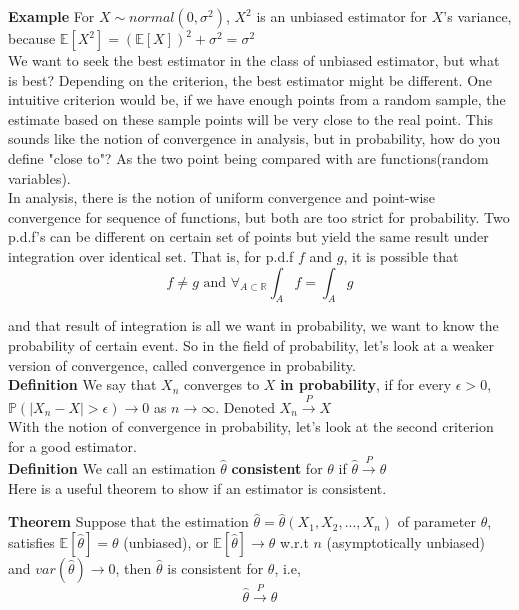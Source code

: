 \textbf{Example} For $X \sim normal(0, \sigma^2)$, $X^2$ is an unbiased estimator for $X$'s variance, because $\mathbb{E}[X^2] = (\mathbb{E}[X])^2 + \sigma^2 = \sigma^2$\\

We want to seek the best estimator in the class of unbiased estimator, but what is best? Depending on the criterion, the best estimator might be different. One intuitive criterion would be, if we have enough points from a random sample, the estimate based on these sample points will be very close to the real point. This sounds like the notion of convergence in analysis, but in probability, how do you define "close to"? As the two point being compared with are functions(random variables).\\

In analysis, there is the notion of uniform convergence and point-wise convergence for sequence of functions, but both are too strict for probability. Two p.d.f's can be different on certain set of points but yield the same result under integration over identical set. That is, for p.d.f $f$ and $g$, it is possible that
$$f \neq g \text{ and } \forall_{A\subset \mathbb{R}} \int_A f = \int_A g$$

and that result of integration is all we want in probability, we want to know the probability of certain event. So in the field of probability, let's look at a weaker version of convergence, called convergence in probability.\\

\textbf{Definition} We say that $X_n$ converges to $X$ \textbf{in probability}, if for every $\epsilon > 0$, $\mathbb{P}(|X_n-X|>\epsilon) \to 0$ as $n \to \infty$. Denoted $X_n \overset{P}{\to} X$\\

With the notion of convergence in probability, let's look at the second criterion for a good estimator.\\

\textbf{Definition}  We call an estimation $\hat{\theta}$ \textbf{consistent} for $\theta$ if $\hat{\theta} \overset{P}{\to} \theta$\\

Here is a useful theorem to show if an estimator is consistent.

\textbf{Theorem} Suppose that the estimation $\hat{\theta} = \hat{\theta}(X_1, X_2, ..., X_n)$ of parameter $\theta$, satisfies $\mathbb{E}[\hat{\theta}] = \theta$ (unbiased), or $\mathbb{E}[\hat{\theta}] \to \theta$ w.r.t $n$  (asymptotically unbiased) and
$var( \hat{\theta} ) \to 0$, then $\hat{\theta}$ is consistent for $\theta$, i.e,
$$\hat{\theta} \overset{P}{\to} \theta$$


